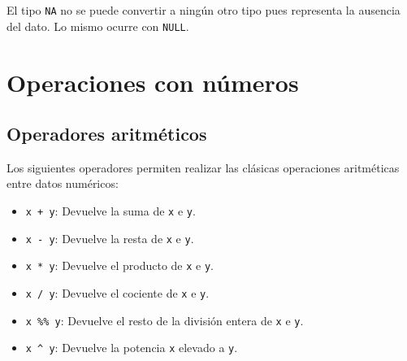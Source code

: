 \documentclass[
  a4paper,
]{scrreport}
\providecommand{\tightlist}{%
  \setlength{\itemsep}{0pt}\setlength{\parskip}{0pt}}\usepackage{longtable,booktabs,array}
\theoremstyle{definition}
\theoremstyle{definition}
\theoremstyle{remark}
\begin{document}
El tipo \texttt{NA} no se puede convertir a ningún otro tipo pues
representa la ausencia del dato. Lo mismo ocurre con \texttt{NULL}.

\hypertarget{operaciones-con-nuxfameros}{%
\section{Operaciones con números}\label{operaciones-con-nuxfameros}}

\hypertarget{operadores-aritmuxe9ticos}{%
\subsection{Operadores aritméticos}\label{operadores-aritmuxe9ticos}}

Los siguientes operadores permiten realizar las clásicas operaciones
aritméticas entre datos numéricos:

\begin{itemize}
\tightlist
\item
  \texttt{x\ +\ y}: Devuelve la suma de \texttt{x} e \texttt{y}.
\item
  \texttt{x\ -\ y}: Devuelve la resta de \texttt{x} e \texttt{y}.
\item
  \texttt{x\ *\ y}: Devuelve el producto de \texttt{x} e \texttt{y}.
\item
  \texttt{x\ /\ y}: Devuelve el cociente de \texttt{x} e \texttt{y}.\\
\item
  \texttt{x\ \%\%\ y}: Devuelve el resto de la división entera de
  \texttt{x} e \texttt{y}.\\
\item
  \texttt{x\ \^{}\ y}: Devuelve la potencia \texttt{x} elevado a
  \texttt{y}.
\end{itemize}
\end{document}

